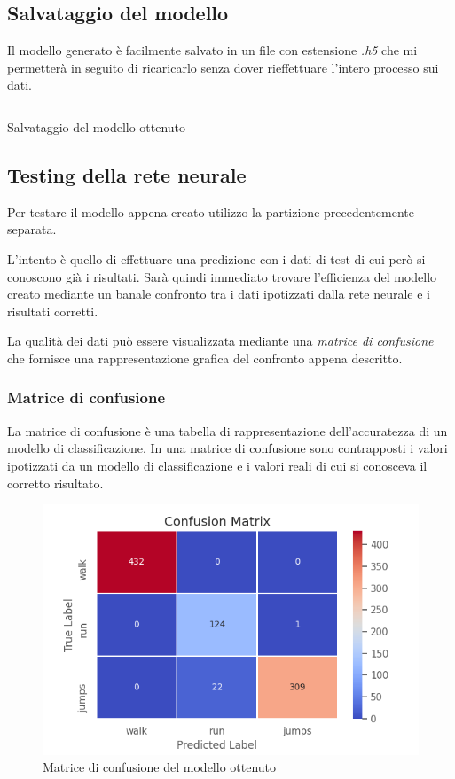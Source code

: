 \subsection{Salvataggio del modello}
Il modello generato è facilmente salvato in un file con estensione \textit{.h5} che mi permetterà in seguito 
di ricaricarlo senza dover rieffettuare l'intero processo sui dati.
\begin{listing}[H] 
    \inputminted[frame=single,framesep=10pt]{python}{assets/snippets/classifier/save_model.py}
    \caption{Salvataggio del modello ottenuto}
\end{listing}


\subsection{Testing della rete neurale}
Per testare il modello appena creato utilizzo la partizione precedentemente separata.

L'intento è quello di effettuare una predizione con i dati di test di cui però si conoscono già i risultati. 
Sarà quindi immediato trovare l'efficienza del modello creato mediante un banale confronto tra i dati ipotizzati 
dalla rete neurale e i risultati corretti.

La qualità dei dati può essere visualizzata mediante una \textit{matrice di confusione} che fornisce una rappresentazione 
grafica del confronto appena descritto.

\subsubsection{Matrice di confusione}
La matrice di confusione è una tabella di rappresentazione dell'accuratezza di un modello di classificazione. 
In una matrice di confusione sono contrapposti i valori ipotizzati da un modello di classificazione e i valori reali 
di cui si conosceva il corretto risultato.

\begin{figure}[H]
    \centering
    \includegraphics[scale = 0.60]{assets/images/classifications/accelerometer/right_hand/confusion-matrix-right-hand-acc.png}
    \caption{Matrice di confusione del modello ottenuto}
\end{figure}



